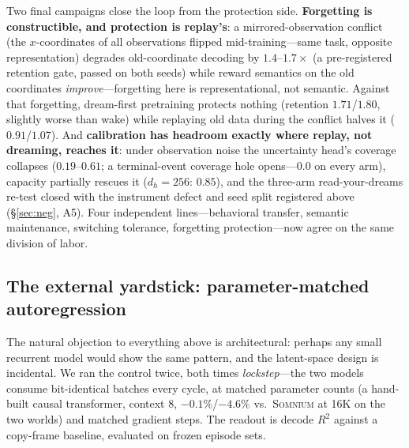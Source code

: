 \documentclass[11pt,a4paper]{article}
\newcommand{\som}{\textsc{Somnium}}
\begin{document}
Two final campaigns close the loop from the protection side. \textbf{Forgetting is constructible, and protection is replay's}: a mirrored-observation conflict (the $x$-coordinates of all observations flipped mid-training---same task, opposite representation) degrades old-coordinate decoding by $1.4$--$1.7\times$ (a pre-registered retention gate, passed on both seeds) while reward semantics on the old coordinates \emph{improve}---forgetting here is representational, not semantic. Against that forgetting, dream-first pretraining protects nothing (retention $1.71$/$1.80$, slightly worse than wake) while replaying old data during the conflict halves it ($0.91$/$1.07$). And \textbf{calibration has headroom exactly where replay, not dreaming, reaches it}: under observation noise the uncertainty head's coverage collapses ($0.19$--$0.61$; a terminal-event coverage hole opens---$0.0$ on every arm), capacity partially rescues it ($d_h{=}256$: $0.85$), and the three-arm read-your-dreams re-test closed with the instrument defect and seed split registered above (\S\ref{sec:neg}, A5). Four independent lines---behavioral transfer, semantic maintenance, switching tolerance, forgetting protection---now agree on the same division of labor.

\subsection{The external yardstick: parameter-matched autoregression}\label{sec:external}

The natural objection to everything above is architectural: perhaps any small recurrent model would show the same pattern, and the latent-space design is incidental. We ran the control twice, both times \emph{lockstep}---the two models consume bit-identical batches every cycle, at matched parameter counts (a hand-built causal transformer, context 8, $-0.1\%$/$-4.6\%$ vs.\ \som{} at 16K on the two worlds) and matched gradient steps. The readout is decode $R^2$ against a copy-frame baseline, evaluated on frozen episode sets.
\end{document}
